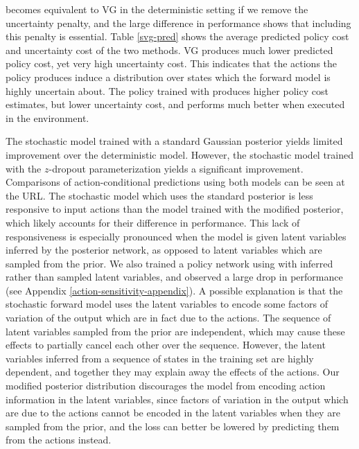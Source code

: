\documentclass{article} %
\begin{document}
\modelnamedrop becomes equivalent to VG in the deterministic setting if we remove the uncertainty penalty, and the large difference in performance shows that including this penalty is essential.
Table \ref{svg-pred} shows the average predicted policy cost and uncertainty cost of the two methods.
VG produces much lower predicted policy cost, yet very high uncertainty cost. This indicates that the actions the policy produces induce a distribution over states which the forward model is highly uncertain about. The policy trained with \modelnamedrop produces higher policy cost estimates, but lower uncertainty cost, and performs much better when executed in the environment.

The stochastic model trained with a standard Gaussian posterior yields limited improvement over the deterministic model. 
However, the stochastic model trained with the $z$-dropout parameterization yields a significant improvement. 
Comparisons of action-conditional predictions using both models can be seen at the URL.
The stochastic model which uses the standard posterior is less responsive to input actions than the model trained with the modified posterior, which likely accounts for their difference in performance. 
This lack of responsiveness is especially pronounced when the model is given latent variables inferred by the posterior network, as opposed to latent variables which are sampled from the prior.
We also trained a policy network using \modelnamedrop with inferred rather than sampled latent variables, and observed a large drop in performance (see Appendix \ref{action-sensitivity-appendix}). A possible explanation is that the stochastic forward model uses the latent variables to encode some factors of variation of the output which are in fact due to the actions.
The sequence of latent variables sampled from the prior are independent, which may cause these effects to partially cancel each other over the sequence. However, the latent variables inferred from a sequence of states in the training set are highly dependent, and together they may explain away the effects of the actions. 
Our modified posterior distribution discourages the model from encoding action information in the latent variables, since factors of variation in the output which are due to the actions cannot be encoded in the latent variables when they are sampled from the prior, and the loss can better be lowered by predicting them from the actions instead.
\end{document}
